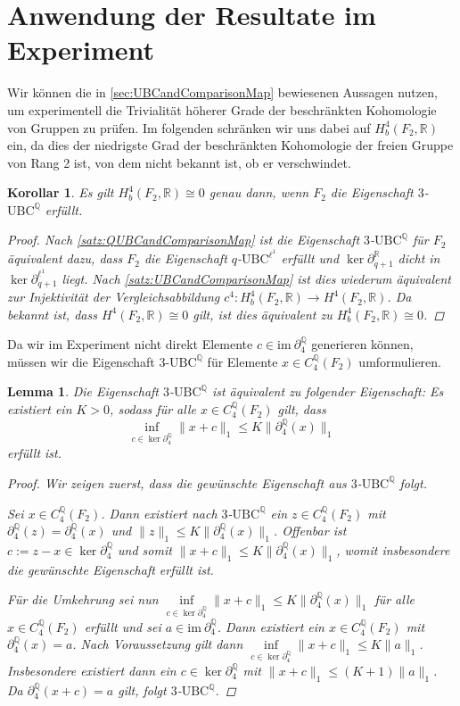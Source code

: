 \documentclass[a4paper,twoside,10pt]{scrreprt}
\newcommand {\img}{\text{im}~}
\newcommand{\Q}{\mathbb{Q}}
\newcommand{\R}{\mathbb{R}}
\newtheorem{lemma}[satz]{Lemma}
\newtheorem{korollar}[satz]{Korollar}
\theoremstyle{definition}
\begin{document}
\section{Anwendung der Resultate im Experiment}
Wir können die in \cref{sec:UBCandComparisonMap} bewiesenen Aussagen nutzen, um experimentell die Trivialität höherer Grade der beschränkten Kohomologie von Gruppen zu prüfen. Im folgenden schränken wir uns dabei auf $H_b^4(F_2,\R)$ ein, da dies der niedrigste Grad der beschränkten Kohomologie der freien Gruppe von Rang 2 ist, von dem nicht bekannt ist, ob er verschwindet.
\begin{korollar} 
Es gilt $H_b^4(F_2,\R)\cong 0$ genau dann, wenn $F_2$ die Eigenschaft $3$-$\text{UBC}^{\Q}$ erfüllt.
\begin{proof}
Nach \cref{satz:QUBCandComparisonMap} ist die Eigenschaft $3$-$\text{UBC}^{\Q}$ für $F_2$ äquivalent dazu, dass $F_2$ die Eigenschaft $q$-$\text{UBC}^{\ell^1}$ erfüllt und $\ker \partial_{q+1}^{\R}$ dicht in $\ker \partial_{q+1}^{\ell^1}$ liegt. Nach \cref{satz:UBCandComparisonMap} ist dies wiederum äquivalent zur Injektivität der Vergleichsabbildung $c^4:H_b^4(F_2,\R)\to H^4(F_2,\R)$. Da bekannt ist, dass $H^4(F_2,\R)\cong 0$ gilt, ist dies äquivalent zu $H_b^4(F_2,\R)\cong 0$.
\end{proof}
\end{korollar}
Da wir im Experiment nicht direkt Elemente $c\in\img\partial_4^{\Q}$ generieren können, müssen wir die Eigenschaft $3$-$\text{UBC}^{\Q}$ für Elemente $x\in C_4^{\Q}(F_2)$ umformulieren. 
\begin{lemma}\label{lem:AltQUBC}
Die Eigenschaft $3$-$\text{UBC}^{\Q}$ ist äquivalent zu folgender Eigenschaft:
Es existiert ein $K>0$, sodass für alle $x\in C_4^{\Q}(F_2)$ gilt, dass 
\begin{equation*}
\inf\limits_{c\in\ker\partial_4^{\Q}}\|x+c\|_1\leq K\|\partial_4^{\Q}(x)\|_1
\end{equation*}
erfüllt ist.
\begin{proof}
Wir zeigen zuerst, dass die gewünschte Eigenschaft aus $3$-$\text{UBC}^{\Q}$ folgt.\par
Sei $x\in C_4^{\Q}(F_2)$. Dann existiert nach $3$-$\text{UBC}^{\Q}$ ein $z\in C_4^{\Q}(F_2)$ mit $\partial_4^{\Q}(z)=\partial_4^{\Q}(x)$ und $\|z\|_1\leq K\|\partial_4^{\Q}(x)\|_1$. Offenbar ist $c:=z-x\in\ker\partial_4^{\Q}$ und somit $\|x+c\|_1\leq K\|\partial_4^{\Q}(x)\|_1$, womit insbesondere die gewünschte Eigenschaft erfüllt ist.\par
Für die Umkehrung sei nun $\inf\limits_{c\in\ker\partial_4^{\Q}}\|x+c\|_1\leq K\|\partial_4^{\Q}(x)\|_1$ für alle $x\in C_4^{\Q}(F_2)$ erfüllt und sei $a\in\img\partial_4^{\Q}$. Dann existiert ein $x\in C_4^{\Q}(F_2)$ mit $\partial_4^{\Q}(x)=a$.
Nach Voraussetzung gilt dann $\inf\limits_{c\in\ker\partial_4^{\Q}}\|x+c\|_1\leq K\|a\|_1$. Insbesondere existiert dann ein $c\in\ker\partial_4^{\Q}$ mit $\|x+c\|_1\leq (K+1)\|a\|_1$. Da $\partial_4^{\Q}(x+c)=a$ gilt, folgt $3$-$\text{UBC}^{\Q}$. 
\end{proof}
\end{lemma}
\end{document}
